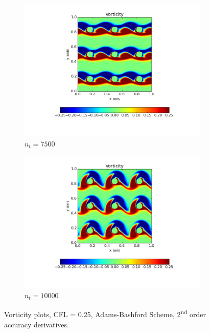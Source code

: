 \documentclass[10pt, a4paper]{article}
\begin{document}
\begin{figure}[htb!]
\begin{subfigure}{.5\textwidth}
  \includegraphics[width=1.1\linewidth, clip=true, trim=1cm 2cm 1cm 1cm]{q1_0003}
  \caption{$n_t = 7500$}
\end{subfigure}%
\begin{subfigure}{.5\textwidth}
  \centering
  \includegraphics[width=1.1\linewidth, clip=true, trim=1cm 2cm 1cm 1cm]{q1_0004}
  \caption{$n_t = 10000$}
\end{subfigure}
\caption{Vorticity plots, CFL = 0.25, Adams-Bashford Scheme, 2\textsuperscript{nd} order accuracy derivatives.}
\label{fig:q1}
\end{figure}

\newpage
\end{document}
